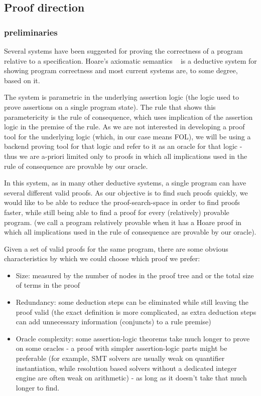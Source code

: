 \subsection{Proof direction}

\subsubsection{preliminaries}
Several systems have been suggested for proving the correctness of a program relative to a specification.
Hoare's axiomatic semantics ~\cite{DBLP:journals/cacm/Hoare69} is a deductive system for showing program correctness and most current systems are, to some degree, based on it.

The system is parametric in the underlying assertion logic (the logic used to prove assertions on a single program state).
The rule that shows this parametericity is the rule of consequence, which uses implication of the assertion logic in the premise of the rule. As we are not interested in developing a proof tool for the underlying logic (which, in our case means FOL), we will be using a backend proving tool for that logic and refer to it as an oracle for that logic - thus we are a-priori limited only to proofs in which all implications used in the rule of consequence are provable by our oracle.

In this system, as in many other deductive systems, a single program can have several different valid proofs.
As our objective is to find such proofs quickly, we would like to be able to reduce the proof-search-space in order to find proofs faster, while still being able to find a proof for every (relatively) provable program.
(we call a program relatively provable when it has a Hoare proof in which all implications used in the rule of consequence are provable by our oracle).

Given a set of valid proofs for the same program, there are some obvious characteristics by which we could choose which proof we prefer:
\begin{itemize}
	\item Size: measured by the number of nodes in the proof tree and or the total size of terms in the proof
	\item Redundancy: some deduction steps can be eliminated while still leaving the proof valid (the exact definition is more complicated, as extra deduction steps can add unnecessary information (conjuncts) to a rule premise)
	\item Oracle complexity: some assertion-logic theorems take much longer to prove on some oracles - a proof with simpler assertion-logic parts might be preferable (for example, SMT solvers are usually weak on quantifier instantiation, while resolution based solvers without a dedicated integer engine are often weak on arithmetic) - as long as it doesn't take that much longer to find.
\end{itemize}

